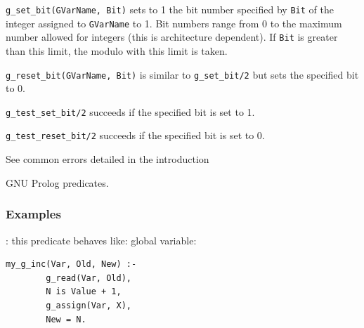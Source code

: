\Description

\texttt{g\_set\_bit(GVarName, Bit)} sets to 1 the bit number specified by
\texttt{Bit} of the integer assigned to \texttt{GVarName} to 1. Bit numbers
range from 0 to the maximum number allowed for integers (this is architecture dependent). If \texttt{Bit} is greater than this limit,
the modulo with this limit is taken.

\texttt{g\_reset\_bit(GVarName, Bit)} is similar to \texttt{g\_set\_bit/2} but
sets the specified bit to 0.

\texttt{g\_test\_set\_bit/2} succeeds if the specified bit is set to 1.

\texttt{g\_test\_reset\_bit/2} succeeds if the specified bit is set to 0.

\Errors

See common errors detailed in the introduction 

\begin{PlErrorsNoTitle}






\end{PlErrorsNoTitle}

\Portability

GNU Prolog predicates.

\subsubsection{Examples}
\label{Examples}

: this predicate behaves like:
global variable:

\begin{Code}
\begin{verbatim}
my_g_inc(Var, Old, New) :-
        g_read(Var, Old),
        N is Value + 1,
        g_assign(Var, X),
        New = N.
\end{verbatim}
\end{Code}

